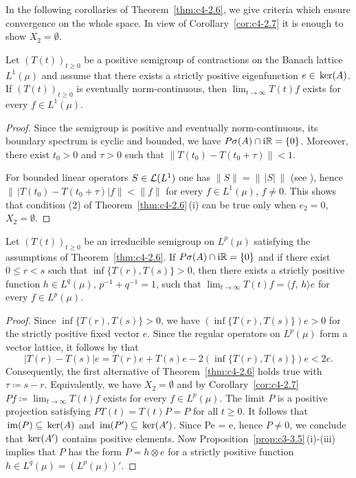 In the following corollaries of Theorem~\ref{thm:c4-2.6}, we give criteria which ensure convergence on the whole space.
In view of Corollary~\ref{cor:c4-2.7} it is enough to show $X_{2} = \emptyset$.
\begin{corollary}\label{cor:c4-2.9}
%
Let $(T(t))_{t \geq 0}$ be a positive semigroup of contractions on the Banach lattice $L^{1}(\mu)$ and assume that there exists a strictly positive eigenfunction $e \in \mathop{}\mathrm{ker}(A)$.
If\/ $(T(t))_{t \geq 0}$ is eventually norm-continuous, then $\lim_{t \to \infty}T(t)f$ exists for every $f \in L^{1}(\mu)$.
\end{corollary}
\begin{proof}
Since the semigroup is positive and eventually norm-continuous, its boundary spectrum is cyclic and bounded, \ie  we have $P{\sigma}(A) \cap \mathrm{i}\mathbb{R} = \{0\}$.
Moreover, there exist $t_{0} > 0$ and $\tau > 0$ such that $\|T(t_{0}) - T(t_{0}+\tau)\| < 1$.

For bounded linear operators $S \in \mathcal{L}(L^{1})$ 
one has $\|S\| = \|\,|S|\,\|$ (see \textcite[IV, Theorem 1.5]{schaefer:1974}), hence $\|\,|T(t_{0}) - T(t_{0}+\tau)| f\| < \|f\|$ for every $f \in L^{1}(\mu)$, $f \neq 0$.
This shows that condition (2) of Theorem~\ref{thm:c4-2.6}\,(i) can be true only when $e_{2} = 0$, \ie  $X_{2} = \emptyset$.
\end{proof}
\begin{corollary}\label{cor:c4-2.10}
%
%
Let $(T(t))_{t\geq 0}$ be an irreducible semigroup on $L^{p}(\mu)$ satisfying the assumptions of Theorem~\ref{thm:c4-2.6}.
If\/ $P{\sigma}(A) \cap \mathrm{i}\mathbb{R} = \{0\}$ and if there exist $0 \leq r < s$ such that $\inf\{T(r),T(s)\} > 0$, then there exists a strictly positive function $h \in L^{q}(\mu)$, $p^{-1}+q^{-1} = 1$, such that $\lim_{t \to \infty} T(t)f = \langle f,\,h \rangle e$ for every $f \in L^{p}(\mu)$.
\end{corollary}
\begin{proof}
Since $\inf\{T(r),T(s)\} > 0$, we have $(\inf\{T(r),T(s)\})e > 0$ for the strictly positive fixed vector $e$.
Since the regular operators on $L^{p}(\mu)$ form a vector lattice, it follows by \textcite[II.1.4, Formula (5) \& (5')]{schaefer:1974} that 
\[
|T(r) - T(s)|e = T(r)e + T(s)e - 2(\inf\{T(r),T(s)\})e < 2e .
\]
Consequently, the first alternative of Theorem~\ref{thm:c4-2.6} holds true with $\tau \coloneqq s-r$.
Equivalently, we have $X_{2} = \emptyset$ and by Corollary~\ref{cor:c4-2.7} $Pf \coloneqq \lim_{t \to \infty} T(t)f$ exists for every $f \in L^{p}(\mu)$.
The limit $P$ is a positive projection satisfying $PT(t) = T(t)P = P$ for all $t \geq 0$.
It follows that $\mathop{}\mathrm{im}(P) \subseteq \mathop{}\mathrm{ker}(A)$ and $\mathop{}\mathrm{im}(P') \subseteq \mathop{}\mathrm{ker}(A')$.
Since Pe = e, hence $P \neq 0$, we conclude that $\mathop{}\mathrm{ker}(A')$ contains positive elements.
Now Proposition~\ref{prop:c3-3.5}\,(i)-(iii) implies that $P$ has the form $P = h \otimes e$ for a strictly positive function $h \in L^{q}(\mu) = (L^{p}(\mu))'$.
\end{proof}
